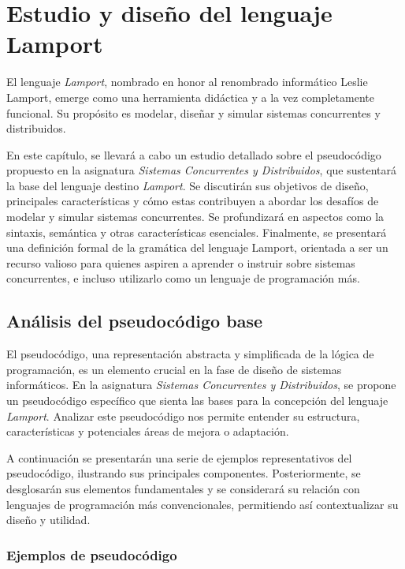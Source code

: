 \chapter{\textbf{Estudio y diseño del lenguaje Lamport}}
El lenguaje \textit{Lamport}, nombrado en honor al renombrado informático Leslie Lamport, emerge como una herramienta didáctica y a la vez completamente funcional. Su propósito es modelar, diseñar y simular sistemas concurrentes y distribuidos.



En este capítulo, se llevará a cabo un estudio detallado sobre el pseudocódigo propuesto en la asignatura \textit{Sistemas Concurrentes y Distribuidos}, que sustentará la base del lenguaje destino \textit{Lamport}. Se discutirán sus objetivos de diseño, principales características y cómo estas contribuyen a abordar los desafíos de modelar y simular sistemas concurrentes. Se profundizará en aspectos como la sintaxis, semántica y otras características esenciales. Finalmente, se presentará una definición formal de la gramática del lenguaje Lamport, orientada a ser un recurso valioso para quienes aspiren a aprender o instruir sobre sistemas concurrentes, e incluso utilizarlo como un lenguaje de programación más.

\section{Análisis del pseudocódigo base}\label{sec:pseudoAnalisis}
El pseudocódigo, una representación abstracta y simplificada de la lógica de programación, es un elemento crucial en la fase de diseño de sistemas informáticos. En la asignatura \textit{Sistemas Concurrentes y Distribuidos}, se propone un pseudocódigo específico que sienta las bases para la concepción del lenguaje \textit{Lamport}. Analizar este pseudocódigo nos permite entender su estructura, características y potenciales áreas de mejora o adaptación.



A continuación se presentarán una serie de ejemplos representativos del pseudocódigo, ilustrando sus principales componentes. Posteriormente, se desglosarán sus elementos fundamentales y se considerará su relación con lenguajes de programación más convencionales, permitiendo así contextualizar su diseño y utilidad.

\newpage

\subsection{Ejemplos de pseudocódigo}\label{subsec:pseudoAnalisisEjemplos}

